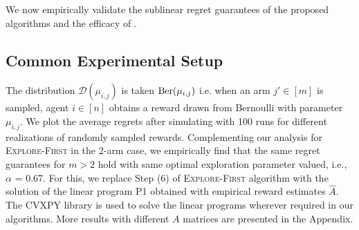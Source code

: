 

We now empirically validate the sublinear regret guarantees of the proposed algorithms and the efficacy of \ouralgo. 
\subsection{Common Experimental Setup}
The distribution $\mathcal{D}(\mu_{i,j})$ is taken $\textup{Ber}(\mu_{i, j})$ i.e. when an arm $j'\in [m]$ is sampled, agent $i\in [n]$ obtains a reward drawn from Bernoulli with parameter $\mu_{i, j}$. We plot the average regrets after simulating with 100 runs for different realizations of randomly sampled rewards. Complementing our analysis for \textsc{Explore-First} in the 2-arm case, we empirically find that the same regret guarantees for $m>2$ hold with same optimal exploration parameter valued, i.e.,  $\alpha$ = 0.67. For this, we replace Step (6) of \textsc{Explore-First} algorithm with the solution of the linear program P1 obtained with empirical reward estimates $\hat{A}$. The CVXPY \citep{diamond2016cvxpy} library is used to solve the linear programs wherever required in our algorithms. More results with different $A$ matrices are presented in the Appendix.
